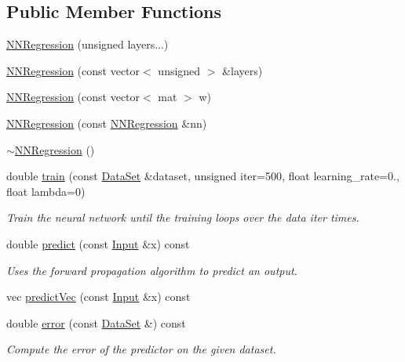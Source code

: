 \subsection*{Public Member Functions}
\begin{DoxyCompactItemize}
\item 
\hyperlink{classhappyml_1_1NNRegression_a841009d2dd46074131720b68835bea93}{N\+N\+Regression} (unsigned layers...)
\item 
\hyperlink{classhappyml_1_1NNRegression_afc2740e5ec788112526934afe3ced3d0}{N\+N\+Regression} (const vector$<$ unsigned $>$ \&layers)
\item 
\hyperlink{classhappyml_1_1NNRegression_a02c9e45196687f410be7827bd637a577}{N\+N\+Regression} (const vector$<$ mat $>$ w)
\item 
\hyperlink{classhappyml_1_1NNRegression_a052de91d7e4224676d6240a389a52533}{N\+N\+Regression} (const \hyperlink{classhappyml_1_1NNRegression}{N\+N\+Regression} \&nn)
\item 
\hyperlink{classhappyml_1_1NNRegression_a05149a76d3e11653190b92bbef7a1f64}{$\sim$\+N\+N\+Regression} ()
\item 
double \hyperlink{classhappyml_1_1NNRegression_ac9c9dcd8d2cd4e9e6f1b742c5dd277b6}{train} (const \hyperlink{classhappyml_1_1DataSet}{Data\+Set} \&dataset, unsigned iter=500, float learning\+\_\+rate=0., float lambda=0)
\begin{DoxyCompactList}\small\item\em Train the neural network until the training loops over the data iter times. \end{DoxyCompactList}\item 
double \hyperlink{classhappyml_1_1NNRegression_aea4c134130125d22c3587b8a9d9c8e1b}{predict} (const \hyperlink{namespacehappyml_a03602d1ec49393790b8a0449f40cd01f}{Input} \&x) const 
\begin{DoxyCompactList}\small\item\em Uses the forward propagation algorithm to predict an output. \end{DoxyCompactList}\item 
vec \hyperlink{classhappyml_1_1NNRegression_af2aadc9111b4bd9cd89afb6847f1bb3f}{predict\+Vec} (const \hyperlink{namespacehappyml_a03602d1ec49393790b8a0449f40cd01f}{Input} \&x) const 
\item 
double \hyperlink{classhappyml_1_1NNRegression_a6f649a08fc94523a49e893ffad766896}{error} (const \hyperlink{classhappyml_1_1DataSet}{Data\+Set} \&) const 
\begin{DoxyCompactList}\small\item\em Compute the error of the predictor on the given dataset. \end{DoxyCompactList}\end{DoxyCompactItemize}
